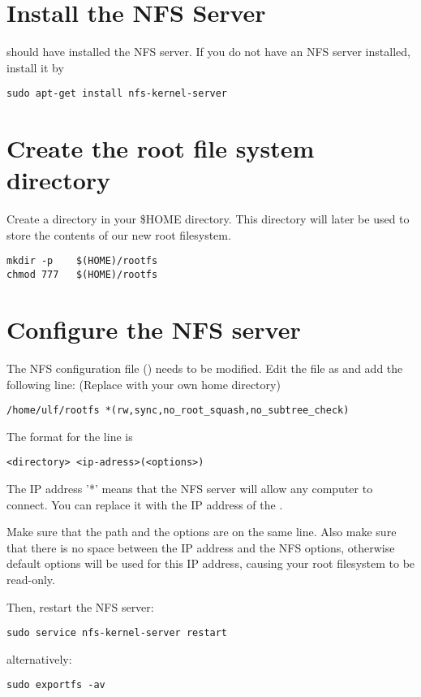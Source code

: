 
\section{Install the NFS Server}

 should have installed the NFS server.
If you do not have an NFS server installed, install it by

\begin{verbatim}
sudo apt-get install nfs-kernel-server
\end{verbatim}

\section{Create the root file system directory}

Create a  directory in your \$HOME directory. This
directory will later be used to store the contents of our new
root filesystem.

\begin{verbatim}
mkdir -p	$(HOME)/rootfs
chmod 777	$(HOME)/rootfs
\end{verbatim}

\section{Configure the NFS server}

The NFS configuration file () needs to be modified.
Edit the file as  and add the following line: (Replace  with your own home directory)

\begin{verbatim}
/home/ulf/rootfs *(rw,sync,no_root_squash,no_subtree_check)
\end{verbatim}

The format for the line is 
\begin{verbatim}
<directory> <ip-adress>(<options>)
\end{verbatim}

The IP address '*' means that the NFS server will allow any computer to connect.
You can replace it with the IP address of the \devboard.

Make sure that the path and the options are on the same line.
Also make sure that there is no space between the IP address and the NFS
options, otherwise default options will be used for this IP address,
causing your root filesystem to be read-only.

Then, restart the NFS server:

\begin{verbatim}
sudo service nfs-kernel-server restart
\end{verbatim}

alternatively:

\begin{verbatim}
sudo exportfs -av
\end{verbatim}

